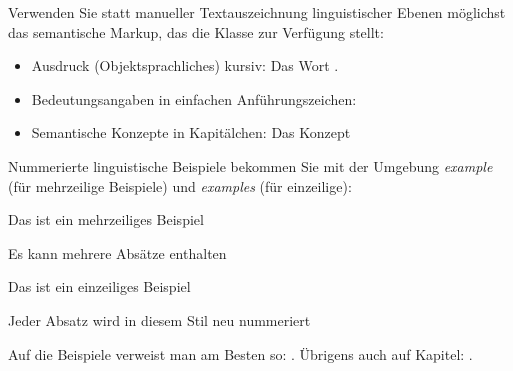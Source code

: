 \documentclass[naustrian]{univie-ling-thesis}
\begin{document}
Verwenden Sie statt manueller Textauszeichnung linguistischer Ebenen möglichst das semantische Markup, das die Klasse zur Verfügung stellt:
\begin{itemize}
	\item Ausdruck (Objektsprachliches) kursiv: Das Wort .
	\item Bedeutungsangaben in einfachen Anführungszeichen: 
	\item Semantische Konzepte in Kapitälchen: Das Konzept 
\end{itemize}
%
Nummerierte linguistische Beispiele bekommen Sie mit der Umgebung \emph{example} (für mehrzeilige Beispiele) und \emph{examples} (für einzeilige):

\begin{example}
	Das ist ein mehrzeiliges Beispiel
	
	Es kann mehrere Absätze enthalten
\end{example}

\begin{examples}
	\item Das ist ein einzeiliges Beispiel\label{exa:Beispiel-einzeilig}
	\item Jeder Absatz wird in diesem Stil neu nummeriert
\end{examples}
%
Auf die Beispiele verweist man am Besten so: . Übrigens auch auf Kapitel: .

\printbibliography[heading=bibnumbered]
\end{document}
